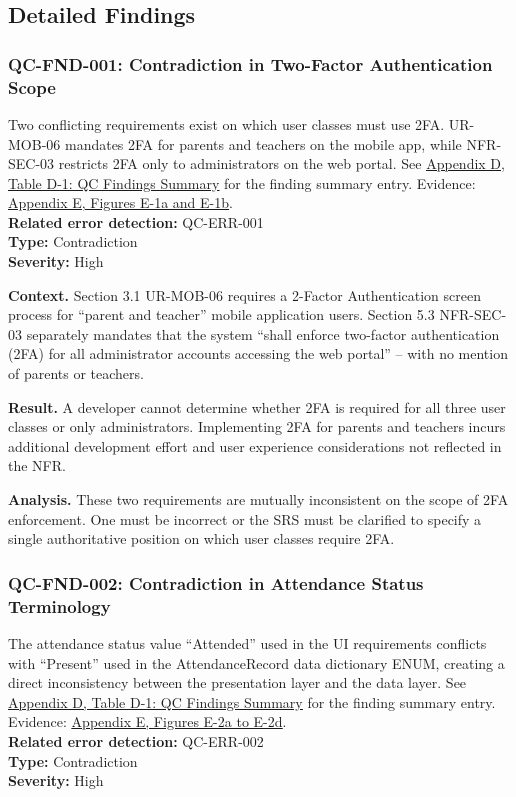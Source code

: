 \documentclass[11pt,a4paper]{article}
\let\orighyperref\hyperref
\renewcommand{\hyperref}[2][]{\orighyperref[#1]{\uline{#2}}}
\begin{document}
\subsection{Detailed Findings}
\label{subsec:detailed-findings}

\subsubsection*{QC-FND-001: Contradiction in Two-Factor Authentication Scope}
Two conflicting requirements exist on which user classes must use 2FA. UR-MOB-06 mandates 2FA for parents and teachers on the mobile app, while NFR-SEC-03 restricts 2FA only to administrators on the web portal. See \hyperref[tab:qc-findings-summary]{Appendix D, Table D-1: QC Findings Summary} for the finding summary entry. Evidence: \hyperref[fig:evidence-001]{Appendix E, Figures E-1a and E-1b}. \\
\textbf{Related error detection:} QC-ERR-001 \\
\textbf{Type:} Contradiction \\
\textbf{Severity:} High

\textbf{Context.} Section 3.1 UR-MOB-06 requires a 2-Factor Authentication screen process for ``parent and teacher'' mobile application users. Section 5.3 NFR-SEC-03 separately mandates that the system ``shall enforce two-factor authentication (2FA) for all administrator accounts accessing the web portal'' -- with no mention of parents or teachers.

\textbf{Result.} A developer cannot determine whether 2FA is required for all three user classes or only administrators. Implementing 2FA for parents and teachers incurs additional development effort and user experience considerations not reflected in the NFR.

\textbf{Analysis.} These two requirements are mutually inconsistent on the scope of 2FA enforcement. One must be incorrect or the SRS must be clarified to specify a single authoritative position on which user classes require 2FA.

\subsubsection*{QC-FND-002: Contradiction in Attendance Status Terminology}
The attendance status value ``Attended'' used in the UI requirements conflicts with ``Present'' used in the AttendanceRecord data dictionary ENUM, creating a direct inconsistency between the presentation layer and the data layer. See \hyperref[tab:qc-findings-summary]{Appendix D, Table D-1: QC Findings Summary} for the finding summary entry. Evidence: \hyperref[fig:evidence-002]{Appendix E, Figures E-2a to E-2d}. \\
\textbf{Related error detection:} QC-ERR-002 \\
\textbf{Type:} Contradiction \\
\textbf{Severity:} High
\end{document}
